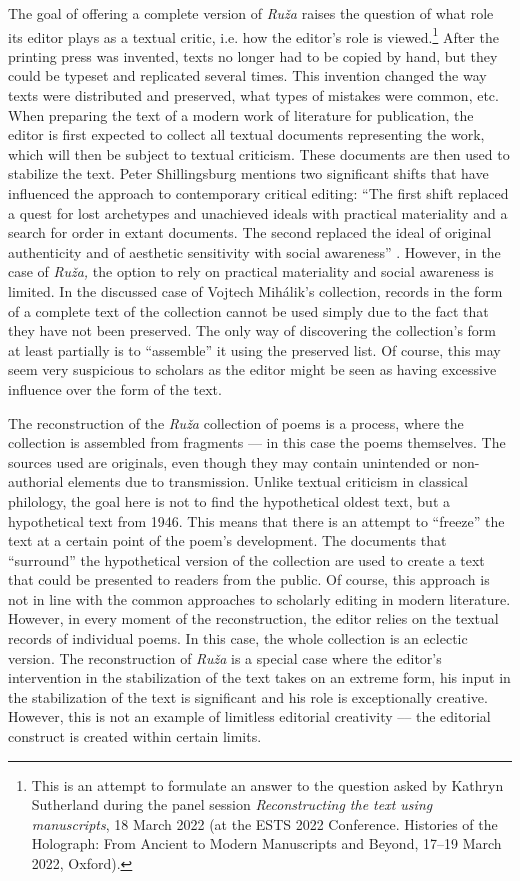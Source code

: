 \begin{paper}
The goal of offering a complete version of \emph{Ruža} raises the
question of what role its editor plays as a textual critic, i.e. how the
editor's role is viewed.\footnote{This is an attempt to formulate an
  answer to the question asked by Kathryn Sutherland during the panel
  session \emph{Reconstructing the text using manuscripts}, 18 March
  2022 (at the ESTS 2022 Conference. Histories of the Holograph: From
  Ancient to Modern Manuscripts and Beyond, 17--19 March 2022, Oxford).}
After the printing press was invented, texts no longer had to be copied
by hand, but they could be typeset and replicated several times. This
invention changed the way texts were distributed and preserved, what
types of mistakes were common, etc. When preparing the text of a modern
work of literature for publication, the editor is first expected to
collect all textual documents representing the work, which will then be
subject to textual criticism. These documents are then used to stabilize
the text. Peter Shillingsburg mentions two significant shifts that have
influenced the approach to contemporary critical editing: ``The first
shift replaced a quest for lost archetypes and unachieved ideals with
practical materiality and a search for order in extant documents. The
second replaced the ideal of original authenticity and of aesthetic
sensitivity with social awareness'' \citep[167]{shillingsburg_how_2010}. However,
in the case of \emph{Ruža,} the option to rely on practical materiality
and social awareness is limited. In the discussed case of Vojtech
Mihálik's collection, records in the form of a complete text of the
collection cannot be used simply due to the fact that they have not been
preserved. The only way of discovering the collection's form at least
partially is to ``assemble'' it using the preserved list. Of course,
this may seem very suspicious to scholars as the editor might be seen as
having excessive influence over the form of the text.

The reconstruction of the \emph{Ruža} collection of poems is a process,
where the collection is assembled from fragments –– in this case the
poems themselves. The sources used are originals, even though they may
contain unintended or non-authorial elements due to transmission. Unlike
textual criticism in classical philology, the goal here is not to find
the hypothetical oldest text, but a hypothetical text from 1946. This
means that there is an attempt to ``freeze'' the text at a certain point
of the poem's development. The documents that ``surround'' the
hypothetical version of the collection are used to create a text that
could be presented to readers from the public. Of course, this approach
is not in line with the common approaches to scholarly editing in modern
literature. However, in every moment of the reconstruction, the editor
relies on the textual records of individual poems. In this case, the
whole collection is an eclectic version. The reconstruction of
\emph{Ruža} is a special case where the editor's intervention in the
stabilization of the text takes on an extreme form, his input in the
stabilization of the text is significant and his role is exceptionally
creative. However, this is not an example of limitless editorial
creativity –– the editorial construct is created within certain limits.


\end{paper}
